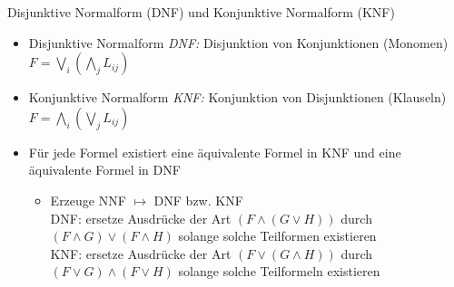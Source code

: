 \begin{frame}{Disjunktive Normalform (DNF) und Konjunktive Normalform (KNF)}
	\begin{itemize}
		\item Disjunktive Normalform \emph{DNF:} Disjunktion von Konjunktionen (Monomen)\\
		$F=\bigvee_i\left(\bigwedge_jL_{ij}\right)$
		\item Konjunktive Normalform \emph{KNF:} Konjunktion von Disjunktionen (Klauseln)\\
		$F=\bigwedge_i\left(\bigvee_jL_{ij}\right)$
		\item Für jede Formel existiert eine äquivalente Formel in KNF und eine äquivalente Formel in DNF
		\begin{itemize}
			\item Erzeuge NNF $\mapsto$ DNF bzw. KNF\\
			DNF: ersetze Ausdrücke der Art $(F \land (G \lor H))$ durch $(F \land G) \lor (F \land H)$ solange solche Teilformen existieren\\
			KNF: ersetze Ausdrücke der Art $(F \lor (G \land H))$ durch $(F \lor G) \land (F \lor H)$ solange solche Teilformeln existieren
		\end{itemize}
	\end{itemize}
\end{frame}


